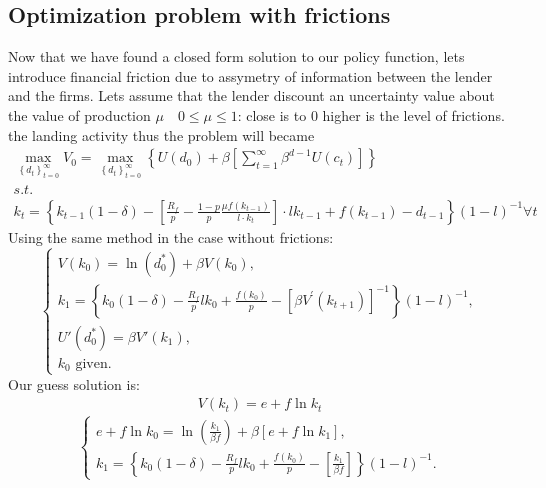 \documentclass[12pt]{article}
\begin{document}
\subsection{Optimization problem with frictions}
Now that we have found a closed form solution to our policy function, lets introduce financial friction due to assymetry
of information between the lender and the firms. Lets assume that the lender discount an uncertainty value about the
value of production \(\mu \quad 0 \leq \mu \leq 1\): close is to 0 higher is the level of frictions.
 the landing activity thus the problem will became 
\begin{equation}
    \begin{gathered}
    \max _{\left\{d_t\right\}_{t=0}^{\infty}} V_0=\max _{\left\{d_t\right\}_{t=0}^{\infty}}\left\{U\left(d_0\right)+\beta\left[\sum_{t=1}^{\infty}
 \beta^{d-1} U\left(c_t\right)\right]\right\}  \\
 s.t. \\
 k_t = \left\{k_{t-1}(1 - \delta) - \left[\frac{R_f}{p}  -\frac{ 1-p }{ p }\frac{\mu f(k_{t-1})}{l \cdot k_t}\right] \cdot l k_{t-1}
+ f(k_{t-1}) - d_{t-1}\right\}{\left(1-l\right)}^{-1} \forall t
    \end{gathered}
\end{equation}
Using the same method in the case without frictions:
\begin{equation}
    \left\{
    \begin{array}{l}
        V\left(k_0\right) = \ln\left(d_0^*\right) + \beta V\left(k_0\right), \\
        k_1 = \left\{k_0(1 - \delta) - \frac{R_f}{p} l k_0  
+ \frac{f(k_0)}{p} - \left[\beta
V^{\prime}(k_{t+1})\right]^{-1} \right\}{\left(1-l\right)}^{-1}, \\ 
        U'\left(d_0^*\right) = \beta V'\left(k_1\right), \\
        k_0 \text{ given.} 
    \end{array}
    \right.
\end{equation}
Our guess solution is:
\begin{equation}
    \begin{gathered}
        V(k_t) = e + f \ln{k_t}
    \end{gathered}
\end{equation}
\begin{equation}
    \left\{
    \begin{array}{l}
        e + f \ln{k_0} = \ln{\left(\frac{k_1}{\beta f}\right)} + \beta \left[e + f \ln{k_1}\right], \\
        k_1 = \left\{k_0(1 - \delta) - \frac{R_f}{p} l k_0  
+ \frac{f(k_0)}{p} - \left[
\frac{k_1}{\beta f}\right] \right\}{\left(1-l\right)}^{-1}.
    \end{array}
    \right.
\end{equation}
\end{document}
